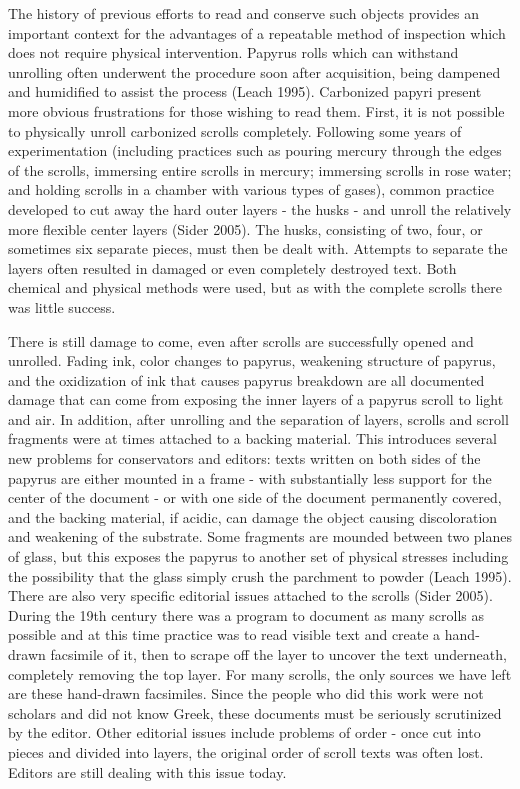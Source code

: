 \documentclass[12pt]{article}
\begin{document}
The history of previous efforts to read and conserve such objects provides an important context for the advantages of a repeatable method of inspection which does not require physical intervention. Papyrus rolls which can withstand unrolling often underwent the procedure soon after acquisition, being dampened and humidified to assist the process (Leach 1995). Carbonized papyri present more obvious frustrations for those wishing to read them. First, it is not possible to physically unroll carbonized scrolls completely. Following some years of experimentation (including practices such as pouring mercury through the edges of the scrolls, immersing entire scrolls in mercury; immersing scrolls in rose water; and holding scrolls in a chamber with various types of gases), common practice developed to cut away the hard outer layers - the husks - and unroll the relatively more flexible center layers (Sider 2005). The husks, consisting of two, four, or sometimes six separate pieces, must then be dealt with. Attempts to separate the layers often resulted in damaged or even completely destroyed text. Both chemical and physical methods were used, but as with the complete scrolls there was little success.

There is still damage to come, even after scrolls are successfully opened and unrolled. Fading ink, color changes to papyrus, weakening structure of papyrus, and the oxidization of ink that causes papyrus breakdown are all documented damage that can come from exposing the inner layers of a papyrus scroll to light and air. In addition, after unrolling and the separation of layers, scrolls and scroll fragments were at times attached to a backing material. This introduces several new problems for conservators and editors: texts written on both sides of the papyrus are either mounted in a frame - with substantially less support for the center of the document - or with one side of the document permanently covered, and the backing material, if acidic, can damage the object causing discoloration and weakening of the substrate. Some fragments are mounded between two planes of glass, but this exposes the papyrus to another set of physical stresses including the possibility that the glass simply crush the parchment to powder (Leach 1995).
There are also very specific editorial issues attached to the scrolls (Sider 2005). During the 19th century there was a program to document as many scrolls as possible and at this time practice was to read visible text and create a hand-drawn facsimile of it, then to scrape off the layer to uncover the text underneath, completely removing the top layer. For many scrolls, the only sources we have left are these hand-drawn facsimiles. Since the people who did this work were not scholars and did not know Greek, these documents must be seriously scrutinized by the editor. Other editorial issues include problems of order - once cut into pieces and divided into layers, the original order of scroll texts was often lost. Editors are still dealing with this issue today.
\end{document}
